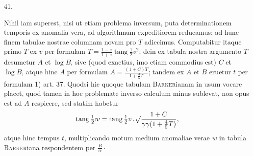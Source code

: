 \begin{center}
\hypertarget{native-059-article041}{}41.
\end{center}
Nihil iam superest, nisi ut etiam problema inversum, puta determinationem temporis ex anomalia vera, ad algorithmum expeditiorem reducamus: ad hunc finem tabulae nostrae columnam novam pro $T$ adiecimus. Computabitur itaque primo $T$ ex $v$ per formulam $T=\frac{1-e}{1+e}\operatorname{tang}\tfrac{1}{2}v^2$; dein ex tabula nostra argumento $T$ desumetur $A$ et $\log B$, sive (quod exactius, imo etiam commodius est) $C$ et $\log B$, atque hinc $A$ per formulam $A=\frac{(1+C)T}{1+\frac{4}{5}T}$; tandem ex $A$ et $B$ eruetur $t$ per formulam 1) art. 37. Quodsi hic quoque tabulam \textsc{Barker}ianam in usum vocare placet, quod tamen in hoc problemate inverso calculum minus sublevat, non opus est ad $A$ respicere, sed statim habetur
\[
\operatorname{tang}\tfrac{1}{2}w=\operatorname{tang}\tfrac{1}{2}v\,\mathord{.}\,\mathord{{}^{}\!\surd}\frac{1+C}{\gamma\gamma(1+\frac{4}{5}T)},
\]
atque hinc tempus $t$, multiplicando motum medium anomaliae verae $w$ in tabula \textsc{Barker}iana respondentem per $\frac{B}{\alpha}\cdot$
